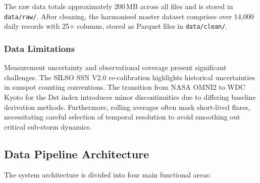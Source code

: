 The raw data totals approximately 200\,MB across all files and is stored in \texttt{data/raw/}. After cleaning, the harmonised master dataset comprises over 14,000 daily records with 25+ columns, stored as Parquet files in \texttt{data/clean/}.

\subsubsection*{Data Limitations}
Measurement uncertainty and observational coverage present significant challenges. The SILSO SSN V2.0 re-calibration highlights historical uncertainties in sunspot counting conventions. The transition from NASA OMNI2 to WDC Kyoto for the Dst index introduces minor discontinuities due to differing baseline derivation methods. Furthermore, rolling averages often mask short-lived flares, necessitating careful selection of temporal resolution to avoid smoothing out critical sub-storm dynamics.


\subsection{Data Pipeline Architecture}

The system architecture is divided into four main functional areas:

